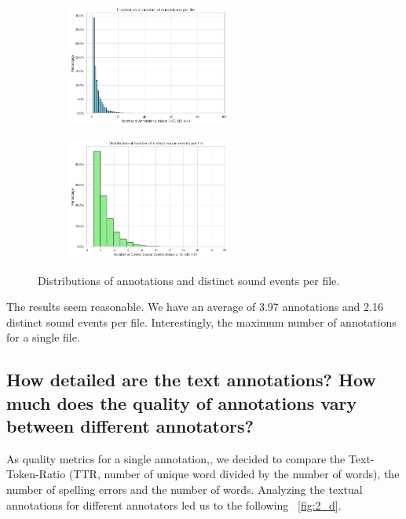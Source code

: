 \documentclass{article}
\begin{document}
\begin{figure}[htbp]
  \centering
  \begin{subfigure}[b]{0.49\textwidth}
    \includegraphics[width=\textwidth, height=4cm]{figs/annotation_dist.png}
  \end{subfigure}
  \hfill
  \begin{subfigure}[b]{0.49\textwidth}
    \includegraphics[width=\textwidth, height=4cm]{figs/sound_event_dist.png}
  \end{subfigure}
  \caption{Distributions of annotations and distinct sound events per file.}
  \label{fig:2_c}
\end{figure}

The results seem reasonable. We have an average of 3.97 annotations and 2.16 distinct sound events per file. Interestingly, the maximum number of annotations for a single file.

\subsection{How detailed are the text annotations? How much does the quality of annotations vary between
different annotators?}
\label{sec:Annotation Quality:b2}
As quality metrics for a single annotation,, we decided to compare the Text-Token-Ratio (TTR, number of unique word divided by the number of words), the number of spelling errors and the number of words. Analyzing the textual annotations for different annotators led us to the following ~\ref{fig:2_d}.
\end{document}
